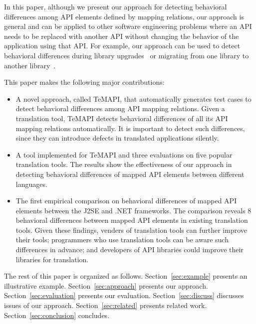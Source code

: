 In this paper, although we present our approach for detecting behavioral differences among API elements defined by mapping relations, our approach is general and can be applied to other software engineering problems where an API needs to be replaced with another API without changing the behavior of the application using that API. For example, our approach can be used to detect behavioral differences during library upgrades~\cite{Kawrykow:2009} or migrating from one library to another library~\cite{Nita:2010}.

This paper makes the following major contributions:

\begin{itemize}%
\item A novel approach, called TeMAPI, that automatically generates test cases to detect behavioral differences among API mapping relations. Given a translation tool, TeMAPI detects behavioral differences of all its API mapping relations automatically. It is important to detect such differences, since they can introduce defects in translated applications silently.%
\item A tool implemented for TeMAPI and three evaluations on five popular translation tools. The results show the effectiveness of our approach in detecting behavioral differences of mapped API elements between different languages.
\item The first empirical comparison on behavioral differences of mapped API elements between the J2SE and .NET frameworks. The comparison reveals 8 behavioral differences between mapped API elements in existing translation tools. Given these findings, venders of translation tools can further improve their tools; programmers who use translation tools can be aware such differences in advance; and developers of API libraries could improve their libraries for translation.
\end{itemize}%

The rest of this paper is organized as follows.
Section~\ref{sec:example} presents an illustrative example.
Section~\ref{sec:approach} presents our approach.
Section~\ref{sec:evaluation} presents our evaluation.
Section~\ref{sec:discuss} discusses issues of our approach.
Section~\ref{sec:related} presents related work.
Section~\ref{sec:conclusion} concludes.


